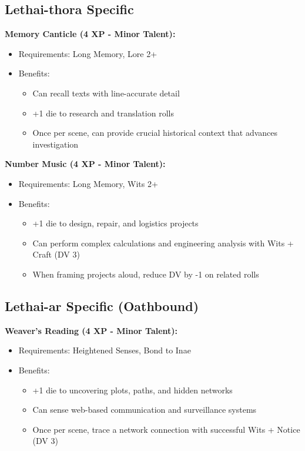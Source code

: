 \documentclass[11pt]{article}
\newcommand{\talent}[1]{\textbf{#1}}
\begin{document}
\subsection*{Lethai-thora Specific}
\talent{Memory Canticle (4 XP - Minor Talent):}
\begin{itemize}
  \item Requirements: Long Memory, Lore 2+
  \item Benefits:
    \begin{itemize}
      \item Can recall texts with line-accurate detail
      \item +1 die to research and translation rolls
      \item Once per scene, can provide crucial historical context that advances investigation
    \end{itemize}
\end{itemize}

\talent{Number Music (4 XP - Minor Talent):}
\begin{itemize}
  \item Requirements: Long Memory, Wits 2+
  \item Benefits:
    \begin{itemize}
      \item +1 die to design, repair, and logistics projects
      \item Can perform complex calculations and engineering analysis with Wits + Craft (DV 3)
      \item When framing projects aloud, reduce DV by -1 on related rolls
    \end{itemize}
\end{itemize}

\subsection*{Lethai-ar Specific (Oathbound)}
\talent{Weaver's Reading (4 XP - Minor Talent):}
\begin{itemize}
  \item Requirements: Heightened Senses, Bond to Inae
  \item Benefits:
    \begin{itemize}
      \item +1 die to uncovering plots, paths, and hidden networks
      \item Can sense web-based communication and surveillance systems
      \item Once per scene, trace a network connection with successful Wits + Notice (DV 3)
    \end{itemize}
\end{itemize}
\end{document}
